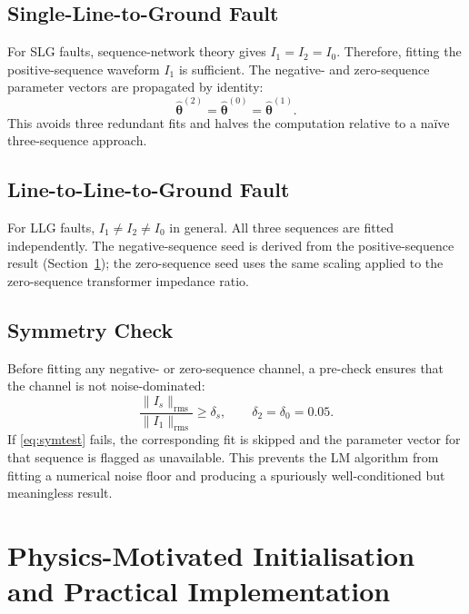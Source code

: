 \documentclass[10pt,journal,twoside]{IEEEtran}
\begin{document}
\subsection{Single-Line-to-Ground Fault}
\label{sec:conditioned:slg}

For SLG faults, sequence-network theory \cite{Kimbark1956} gives
$I_1 = I_2 = I_0$.  Therefore, fitting the positive-sequence waveform
$I_1$ is sufficient.  The negative- and zero-sequence parameter vectors
are propagated by identity:
\begin{equation}
\hat{\bm{\theta}}^{(2)} = \hat{\bm{\theta}}^{(0)} = \hat{\bm{\theta}}^{(1)}.
\label{eq:slgprop}
\end{equation}
This avoids three redundant fits and halves the computation relative to a
na\"{i}ve three-sequence approach.

\subsection{Line-to-Line-to-Ground Fault}
\label{sec:conditioned:llg}

For LLG faults, $I_1 \neq I_2 \neq I_0$ in general.  All three sequences
are fitted independently.  The negative-sequence seed is derived from the
positive-sequence result (Section~\ref{sec:practical}); the zero-sequence
seed uses the same scaling applied to the zero-sequence transformer
impedance ratio.

\subsection{Symmetry Check}
\label{sec:conditioned:sym}

Before fitting any negative- or zero-sequence channel, a pre-check
ensures that the channel is not noise-dominated:
\begin{equation}
\frac{\|I_s\|_{\mathrm{rms}}}{\|I_1\|_{\mathrm{rms}}} \geq \delta_s,
  \qquad \delta_2 = \delta_0 = 0.05.
\label{eq:symtest}
\end{equation}
If \eqref{eq:symtest} fails, the corresponding fit is skipped and the
parameter vector for that sequence is flagged as unavailable.  This prevents
the LM algorithm from fitting a numerical noise floor and producing a
spuriously well-conditioned but meaningless result.

\section{Physics-Motivated Initialisation and Practical Implementation}
\label{sec:practical}
\end{document}
